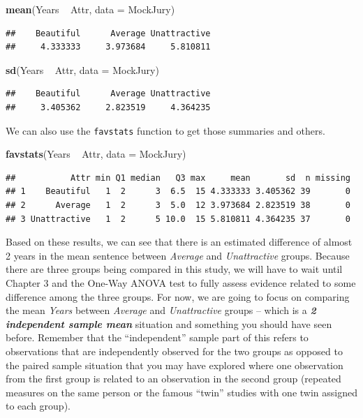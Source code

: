 \documentclass[]{book}
\newenvironment{Shaded}{\begin{snugshade}}{\end{snugshade}}
\newcommand{\KeywordTok}[1]{\textcolor[rgb]{0.13,0.29,0.53}{\textbf{{#1}}}}
\newcommand{\DataTypeTok}[1]{\textcolor[rgb]{0.13,0.29,0.53}{{#1}}}
\newcommand{\StringTok}[1]{\textcolor[rgb]{0.31,0.60,0.02}{{#1}}}
\newcommand{\NormalTok}[1]{{#1}}
\begin{document}
\begin{Shaded}
\begin{Highlighting}[]
\KeywordTok{mean}\NormalTok{(Years ~}\StringTok{ }\NormalTok{Attr, }\DataTypeTok{data =} \NormalTok{MockJury)}
\end{Highlighting}
\end{Shaded}

\begin{verbatim}
##    Beautiful      Average Unattractive 
##     4.333333     3.973684     5.810811
\end{verbatim}

\begin{Shaded}
\begin{Highlighting}[]
\KeywordTok{sd}\NormalTok{(Years ~}\StringTok{ }\NormalTok{Attr, }\DataTypeTok{data =} \NormalTok{MockJury)}
\end{Highlighting}
\end{Shaded}

\begin{verbatim}
##    Beautiful      Average Unattractive 
##     3.405362     2.823519     4.364235
\end{verbatim}

We can also use the \texttt{favstats} function to get those summaries
and others.

\begin{Shaded}
\begin{Highlighting}[]
\KeywordTok{favstats}\NormalTok{(Years ~}\StringTok{ }\NormalTok{Attr, }\DataTypeTok{data =} \NormalTok{MockJury)}
\end{Highlighting}
\end{Shaded}

\begin{verbatim}
##           Attr min Q1 median   Q3 max     mean       sd  n missing
## 1    Beautiful   1  2      3  6.5  15 4.333333 3.405362 39       0
## 2      Average   1  2      3  5.0  12 3.973684 2.823519 38       0
## 3 Unattractive   1  2      5 10.0  15 5.810811 4.364235 37       0
\end{verbatim}

Based on these results, we can see that there is an estimated difference
of almost 2 years in the mean sentence between \emph{Average} and
\emph{Unattractive} groups. Because there are three groups being
compared in this study, we will have to wait until Chapter 3 and the
One-Way ANOVA test to fully assess evidence related to some difference
among the three groups. For now, we are going to focus on comparing the
mean \emph{Years} between \emph{Average} and \emph{Unattractive} groups
-- which is a \textbf{\emph{2 independent sample mean}} situation and
something you should have seen before. Remember that the ``independent''
sample part of this refers to observations that are independently
observed for the two groups as opposed to the paired sample situation
that you may have explored where one observation from the first group is
related to an observation in the second group (repeated measures on the
same person or the famous ``twin'' studies with one twin assigned to
each group).
\end{document}
